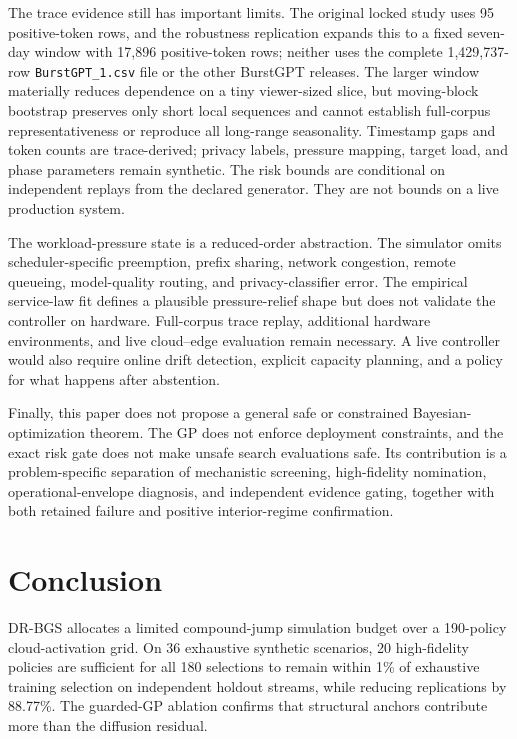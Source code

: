 \documentclass[preprint,12pt]{elsarticle}
\begin{document}
The trace evidence still has important limits. The original locked study uses 95 positive-token rows, and the robustness replication expands this to a fixed seven-day window with 17,896 positive-token rows; neither uses the complete 1,429,737-row \texttt{BurstGPT\_1.csv} file or the other BurstGPT releases. The larger window materially reduces dependence on a tiny viewer-sized slice, but moving-block bootstrap preserves only short local sequences and cannot establish full-corpus representativeness or reproduce all long-range seasonality. Timestamp gaps and token counts are trace-derived; privacy labels, pressure mapping, target load, and phase parameters remain synthetic. The risk bounds are conditional on independent replays from the declared generator. They are not bounds on a live production system.

The workload-pressure state is a reduced-order abstraction. The simulator omits scheduler-specific preemption, prefix sharing, network congestion, remote queueing, model-quality routing, and privacy-classifier error. The empirical service-law fit defines a plausible pressure-relief shape but does not validate the controller on hardware. Full-corpus trace replay, additional hardware environments, and live cloud--edge evaluation remain necessary. A live controller would also require online drift detection, explicit capacity planning, and a policy for what happens after abstention.

Finally, this paper does not propose a general safe or constrained Bayesian-optimization theorem. The GP does not enforce deployment constraints, and the exact risk gate does not make unsafe search evaluations safe. Its contribution is a problem-specific separation of mechanistic screening, high-fidelity nomination, operational-envelope diagnosis, and independent evidence gating, together with both retained failure and positive interior-regime confirmation.
\section{Conclusion}
\label{sec:conclusion}

DR-BGS allocates a limited compound-jump simulation budget over a 190-policy cloud-activation grid. On 36 exhaustive synthetic scenarios, 20 high-fidelity policies are sufficient for all 180 selections to remain within 1\% of exhaustive training selection on independent holdout streams, while reducing replications by 88.77\%. The guarded-GP ablation confirms that structural anchors contribute more than the diffusion residual.
\end{document}
